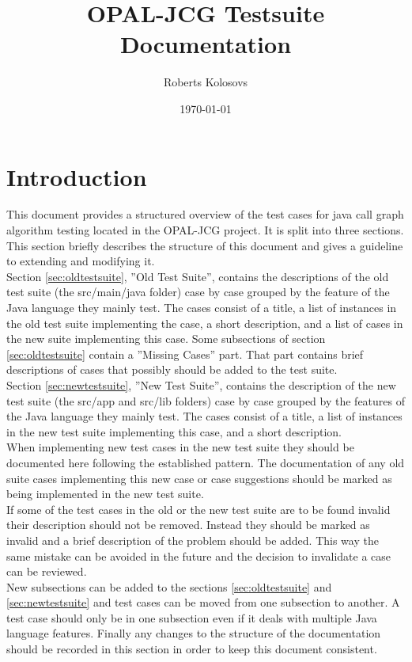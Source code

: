 \documentclass{article}
\title{OPAL-JCG Testsuite Documentation}
\author{Roberts Kolosovs}
\date{\today}
\begin{document}
\maketitle

\section{Introduction}\label{sec:introduction}

This document provides a structured overview of the test cases for java call graph algorithm testing located in the OPAL-JCG project. It is split into three sections. This section briefly describes the structure of this document and gives a guideline to extending and modifying it.\\
Section \ref{sec:oldtestsuite}, ''Old Test Suite'', contains the descriptions of the old test suite (the src/main/java folder) case by case grouped by the feature of the Java language they mainly test. The cases consist of a title, a list of instances in the old test suite implementing the case, a short description, and a list of cases in the new suite implementing this case. Some subsections of section \ref{sec:oldtestsuite} contain a ''Missing Cases'' part. That part contains brief descriptions of cases that possibly should be added to the test suite.\\
Section \ref{sec:newtestsuite}, ''New Test Suite'', contains the description of the new test suite (the src/app and src/lib folders) case by case grouped by the features of the Java language they mainly test. The cases consist of a title, a list of instances in the new test suite implementing this case, and a short description.\\
When implementing new test cases in the new test suite they should be documented here following the established pattern. The documentation of any old suite cases implementing this new case or case suggestions should be marked as being implemented in the new test suite.\\
If some of the test cases in the old or the new test suite are to be found invalid their description should not be removed. Instead they should be marked as invalid and a brief description of the problem should be added. This way the same mistake can be avoided in the future and the decision to invalidate a case can be reviewed.\\
New subsections can be added to the sections \ref{sec:oldtestsuite} and \ref{sec:newtestsuite} and test cases can be moved from one subsection to another. A test case should only be in one subsection even if it deals with multiple Java language features. Finally any changes to the structure of the documentation should be recorded in this section in order to keep this document consistent.
\end{document}
